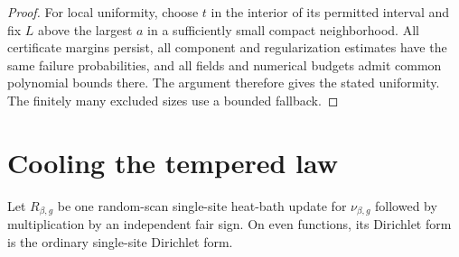 \documentclass[11pt]{article}
\numberwithin{equation}{section}
\begin{document}
\begin{proof}
For local uniformity, choose $t$ in the interior of its permitted interval and fix $L$ above the largest $a$ in a sufficiently small compact neighborhood. All certificate margins persist, all component and regularization estimates have the same failure probabilities, and all fields and numerical budgets admit common polynomial bounds there. The argument therefore gives the stated uniformity. The finitely many excluded sizes use a bounded fallback.
\end{proof}

\section{Cooling the tempered law}\label{tp:cooling}

Let $R_{\beta,g}$ be one random-scan single-site heat-bath update for $\nu_{\beta,g}$ followed by multiplication by an independent fair sign. On even functions, its Dirichlet form is the ordinary single-site Dirichlet form.
\end{document}
